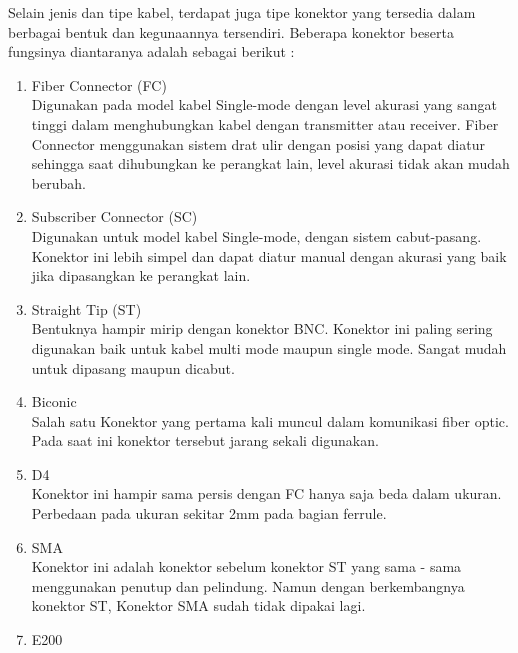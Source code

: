 \begin{flushleft}
Selain jenis dan tipe kabel, terdapat juga tipe konektor yang tersedia dalam berbagai bentuk dan kegunaannya tersendiri. Beberapa konektor beserta fungsinya diantaranya adalah sebagai berikut : \\
\begin{enumerate}
\item Fiber Connector (FC) \\ Digunakan pada model kabel Single-mode dengan level akurasi yang sangat tinggi dalam menghubungkan kabel dengan transmitter atau receiver. Fiber Connector menggunakan sistem drat ulir dengan posisi yang dapat diatur sehingga saat dihubungkan ke perangkat lain, level akurasi tidak akan mudah berubah.
\item Subscriber Connector (SC) \\ Digunakan untuk model kabel Single-mode, dengan sistem cabut-pasang. Konektor ini lebih simpel dan dapat diatur manual dengan akurasi yang baik jika dipasangkan ke perangkat lain.
\item Straight Tip (ST) \\ Bentuknya hampir mirip dengan konektor BNC. Konektor ini paling sering digunakan baik untuk kabel multi mode maupun single mode. Sangat mudah untuk dipasang maupun dicabut.
\item Biconic \\ Salah satu Konektor yang pertama kali muncul dalam komunikasi fiber optic. Pada saat ini konektor tersebut jarang sekali digunakan.
\item D4 \\ Konektor ini hampir sama persis dengan FC hanya saja beda dalam ukuran. Perbedaan pada ukuran sekitar 2mm pada bagian ferrule.
\item SMA \\ Konektor ini adalah konektor sebelum konektor ST yang sama - sama menggunakan penutup dan pelindung. Namun dengan berkembangnya konektor ST, Konektor SMA sudah tidak dipakai lagi.
\item E200
\end{enumerate}
\end{flushleft}
